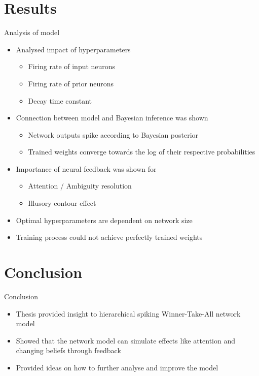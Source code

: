 \documentclass[aspectratio=169]{beamer}
\begin{document}
\section{Results}

\begin{frame}{Analysis of model}
	\vspace{-0.5cm}
    \begin{itemize}
    \item Analysed impact of hyperparameters
	\begin{itemize}
	  \item Firing rate of input neurons
	  \item Firing rate of prior neurons
	  \item Decay time constant
    \end{itemize}	    
    \item Connection between model and Bayesian inference was shown
    \begin{itemize}
      \item Network outputs spike according to Bayesian posterior
      \item Trained weights converge towards the log of their respective probabilities
    \end{itemize}
    \item Importance of neural feedback was shown for 
    \begin{itemize}
	  \item Attention / Ambiguity resolution
	  \item Illusory contour effect
    \end{itemize}  
    \item Optimal hyperparameters are dependent on network size
    \item Training process could not achieve perfectly trained weights  
  \end{itemize}

\end{frame}

\section*{Conclusion}

\begin{frame}{Conclusion}
  \begin{itemize}
	\item Thesis provided insight to hierarchical spiking Winner-Take-All network model
	\item Showed that the network model can simulate effects like attention and changing beliefs through feedback
	\item Provided ideas on how to further analyse and improve the model
  \end{itemize}
\end{frame}
\end{document}
